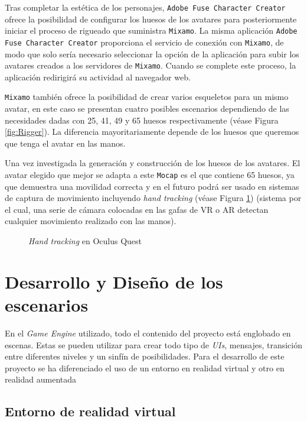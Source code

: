 Tras completar la estética de los personajes, \texttt{Adobe Fuse Character Creator} ofrece la posibilidad de configurar los huesos de los avatares para posteriormente iniciar el proceso de rigueado que suministra \texttt{Mixamo}. La misma aplicación \texttt{Adobe Fuse Character Creator} proporciona el servicio de conexión con \texttt{Mixamo}, de modo que solo sería necesario seleccionar la opción de la aplicación para subir los avatares creados a los servidores de \texttt{Mixamo}. Cuando se complete este proceso, la aplicación redirigirá su actividad al navegador web. 

\texttt{Mixamo} también ofrece la posibilidad de crear varios esqueletos para un mismo avatar, en este caso se presentan cuatro posibles escenarios dependiendo de las necesidades dadas con 25, 41, 49 y 65 huesos respectivamente (véase Figura \ref{fig:Rigger}). La diferencia mayoritariamente depende de los huesos que queremos que tenga el avatar en las manos.

Una vez investigada la generación y construcción de los huesos de los avatares. El avatar elegido que mejor se adapta a este \texttt{Mocap} es el que contiene 65 huesos, ya que demuestra una movilidad correcta y en el futuro podrá ser usado en sistemas de captura de movimiento incluyendo \textit{hand tracking} (véase Figura \ref{fig:HandTracking}) (sistema por el cual, una serie de cámara colocadas en las gafas de VR o AR detectan cualquier movimiento realizado con las manos).

\begin{figure}[h!]
    \centering
    \caption{\textit{Hand tracking} en Oculus Quest}
    \label{fig:HandTracking}  
\end{figure}


\section{Desarrollo y Diseño de los escenarios}

En el \textit{Game Engine} utilizado, todo el contenido del proyecto está englobado en escenas. Estas se pueden utilizar para crear todo tipo de \textit{UIs}, mensajes, transición entre diferentes niveles y un sinfín de posibilidades. Para el desarrollo de este proyecto se ha diferenciado el uso de un entorno en realidad virtual y otro en realidad aumentada

\subsection{Entorno de realidad virtual}

